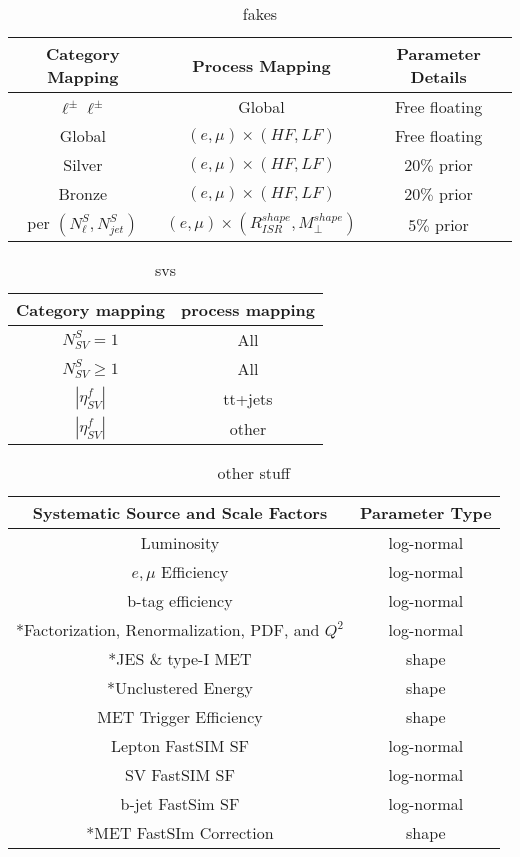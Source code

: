 \begin{table}
\caption{fakes}
\begin{tabular}{ccc}

Category Mapping & Process Mapping & Parameter Details \\ 
\hline 
\hline
$\ell^\pm\ell^\pm$ & Global & Free floating \\ 
 
Global & $(e,\mu)\times(HF,LF)$ & Free floating \\ 
 
Silver & $(e,\mu)\times(HF,LF)$ & $20\%$ prior \\ 
 
Bronze & $(e,\mu)\times(HF,LF)$ & $20\%$ prior \\ 
 
per $(N_\ell^S,N_{jet}^S)$ & $(e,\mu)\times(R_{ISR}^{shape}, M_\perp^{shape})$ & $5\%$ prior \\ 
\hline 
\end{tabular} 
\label{tab:fakenuisance}

\end{table}


\begin{table}
\caption{svs}
\begin{tabular}{cc}
Category mapping & process mapping \\ 
\hline 
\hline
$N_{SV}^S=1$ & All \\ 
 
$N_{SV}^S \geq 1$ & All \\ 
 
$|\eta_{SV}^f|$ & tt+jets \\ 
 
$|\eta_{SV}^f|$ & other \\ 
\hline 
\end{tabular} 
\label{tab:svnuisance}

\end{table}

\begin{table}
\caption{other stuff}
\begin{tabular}{|c|c|}
\hline 
Systematic Source and Scale Factors & Parameter Type \\ 
\hline 
Luminosity & log-normal \\  
$e,\mu$ Efficiency & log-normal \\ 
b-tag efficiency & log-normal \\ 
*Factorization, Renormalization, PDF, and $Q^2$ & log-normal \\ 
*JES \& type-I MET & shape \\ 
*Unclustered Energy & shape \\ 
MET Trigger Efficiency & shape \\ 
Lepton FastSIM SF & log-normal \\ 
SV FastSIM SF & log-normal \\ 
b-jet FastSim SF & log-normal \\ 
*MET FastSIm Correction & shape \\ 
\hline 
\end{tabular} 
\label{tab:othernuisance}

\end{table}

